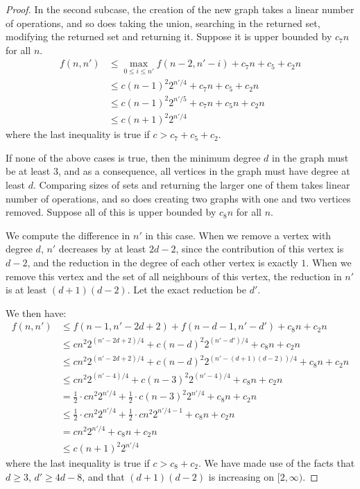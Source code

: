 \documentclass[answers]{exam}
\begin{document}
\begin{questions}
\begin{solution}
\begin{proof}
    In the second subcase, the creation of the new graph takes a linear number of operations, and so does taking the union, searching in the returned set, modifying the returned set and returning it.
    Suppose it is upper bounded by $c_7n$ for all $n$.
    \begin{align*}
        f(n, n') &\le \max_{0 \le i \le n'}f(n - 2, n' - i) + c_7 n + c_5 + c_2 n\\
                &\le c(n - 1)^2 2^{n'/4} + c_7n + c_5 + c_2 n\\
                &\le c(n - 1)^2 2^{n'/5} + c_7n + c_5n + c_2 n\\
                &\le c(n + 1)^2 2^{n'/4}
    \end{align*}
    where the last inequality is true if $c > c_7 + c_5 + c_2$.

    If none of the above cases is true, then the minimum degree $d$ in the graph must be at least $3$, and as a consequence, all vertices in the graph must have degree at least $d$.
    Comparing sizes of sets and returning the larger one of them takes linear number of operations, and so does creating two graphs with one and two vertices removed. 
    Suppose all of this is upper bounded by $c_8 n$ for all $n$.

    We compute the difference in $n'$ in this case. When we remove a vertex with degree $d$, $n'$ decreases by at least $2d - 2$, since the contribution of this vertex is $d - 2$, and the reduction
    in the degree of each other vertex is exactly $1$. 
    When we remove this vertex and the set of all neighbours of this vertex, the reduction in $n'$ is at least $(d + 1)(d - 2)$. Let the exact reduction be $d'$. 

    We then have:
    \begin{align*}
        f(n, n') &\le f(n - 1, n' - 2d + 2) + f(n - d - 1, n' - d') + c_8 n + c_2 n\\
                &\le cn^2 2^{(n' - 2d + 2) / 4} + c(n - d)^2
    2^{(n' - d') / 4} + c_8 n + c_2 n \\
                &\le cn^2 2^{(n' - 2d + 2) / 4} + c(n - d)^2 2^{(n' - (d+1)(d-2)) / 4} + c_8 n + c_2 n \\
                &\le cn^2 2^{(n' - 4) / 4} + c(n - 3)^2 2^{(n' - 4) / 4} + c_8 n + c_2 n \\
                &= \frac{1}{2} \cdot cn^2 2^{n'/4} + \frac{1}{2} \cdot c(n - 3)^2 2^{n'/4} + c_8 n + c_2n\\
                &\le \frac{1}{2} \cdot cn^2 2^{n'/4} + \frac{1}{2} \cdot cn^2 2^{n'/4 - 1} + c_8 n + c_2n\\
                &= cn^2 2^{n'/4} + c_8 n + c_2 n\\
                &\le c(n + 1)^2 2^{n'/4}
    \end{align*}
    where the last inequality is true if $c > c_8 + c_2$. We have made use of the facts that $d \ge 3$, $d' \ge 4d - 8$, and that $(d + 1)(d - 2)$ is increasing on $[2, \infty)$.


\end{proof}
\end{solution}
\end{questions}
\end{document}
